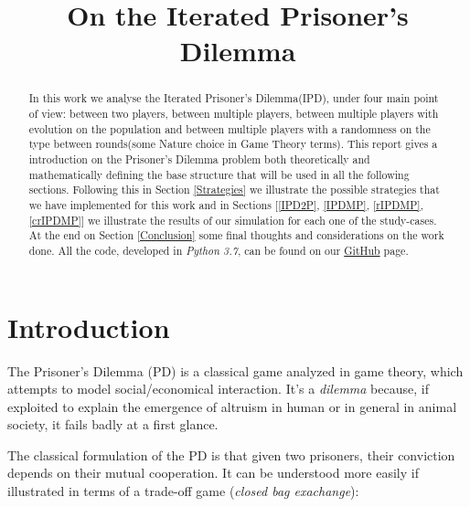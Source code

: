\documentclass[journal,a4paper,10pt,twoside]{IEEEtran}
\begin{document}
\title{On the Iterated Prisoner's Dilemma}

\author{%

}

\maketitle

\begin{abstract}
In this work we analyse the Iterated Prisoner's Dilemma(IPD), under four main point of view: between two players, between multiple players, between multiple players with evolution on the population and between multiple players with a randomness on the type between rounds(some Nature choice in Game Theory terms).
This report gives a introduction on the Prisoner's Dilemma problem both theoretically and mathematically defining the base structure that will be used in all the following sections.
Following this in Section \ref{Strategies} we illustrate the possible strategies that we have implemented for this work and in Sections [\ref{IPD2P}, \ref{IPDMP}, \ref{rIPDMP}, \ref{crIPDMP}] we illustrate the results of our simulation for each one of the study-cases. At the end on Section \ref{Conclusion} some final thoughts and considerations on the work done.
All the code, developed in \textit{Python 3.7}, can be found on our \href{https://github.com/eliabntt/LaboratoryOfComputationalPhysics/tree/Group9}{GitHub} page.
\end{abstract}

\section{Introduction} 
The Prisoner's Dilemma (PD) is a classical game analyzed in game theory, which attempts to model social/economical interaction. It's a \textit{dilemma} because, if exploited to explain the emergence of altruism in human or in general in animal society, it fails badly at a first glance.

The classical formulation of the PD is that given two prisoners, their conviction depends on their mutual cooperation. It can be understood more easily if illustrated in terms of a trade-off game (\textit{closed bag exachange}):
\end{document}
